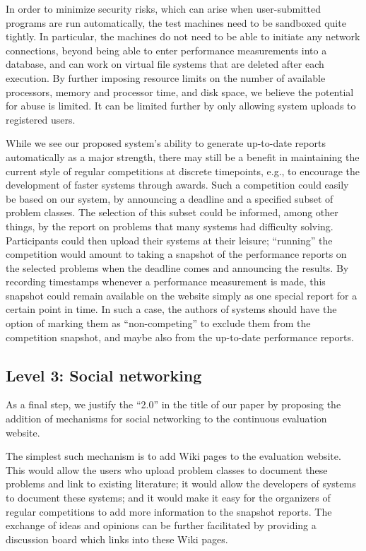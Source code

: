 In order to minimize security risks, which can arise when
user-submitted programs are run automatically, the test machines
need to be sandboxed quite tightly.  In particular, the machines do
not need to be able to initiate any network connections, beyond being
able to enter performance measurements into a database, and can work
on virtual file systems that are deleted after each execution.  By
further imposing resource limits on the number of available
processors, memory and processor time, and disk space, we believe the
potential for abuse is limited.  It can be limited further by only
allowing system uploads to registered users.

While we see our proposed system's ability to generate up-to-date
reports automatically as a major strength, there may still be a
benefit in maintaining the current style of regular competitions at
discrete timepoints, e.g., to encourage the development of faster
systems through awards.  Such a competition could easily be based on
our system, by announcing a deadline and a specified subset of problem
classes. The selection of this subset could be informed, among other
things, by the report on problems that many systems had difficulty
solving. Participants could then upload their systems at their leisure;
``running'' the competition would amount to taking a snapshot of the
performance reports on the selected problems when the deadline comes
and announcing the results.  By recording timestamps whenever a
performance measurement is made, this snapshot could remain available
on the website simply as one special report for a certain point in
time.  In such a case, the authors of systems should have the option
of marking them as ``non-competing'' to exclude them from the
competition snapshot, and maybe also from the up-to-date performance
reports.



\subsection{Level 3: Social networking}

As a final step, we justify the ``2.0'' in the title of our paper by
proposing the addition of mechanisms for social networking to the
continuous evaluation website.

The simplest such mechanism is to add Wiki pages to the evaluation
website.  This would allow the users who upload problem classes to
document these problems and link to existing literature; it would
allow the developers of systems to document these systems; and it
would make it easy for the organizers of regular competitions to add
more information to the snapshot reports.  The exchange of ideas and
opinions can be further facilitated by providing a discussion board
which links into these Wiki pages.

